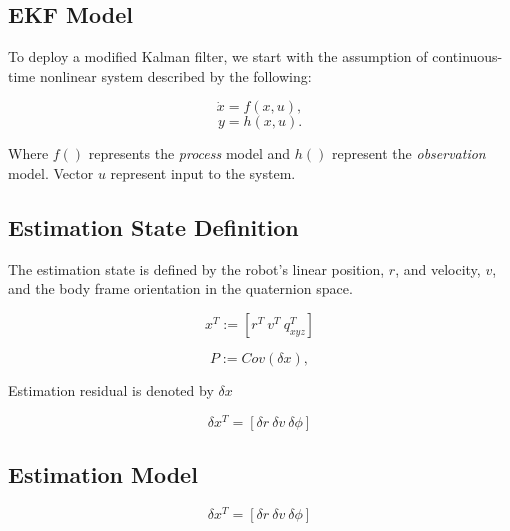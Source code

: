 \documentclass[letterpaper, 10 pt, conference]{ieeeconf}  %
\newcommand{\transpose}[1]{\ensuremath{#1^{\scriptscriptstyle T}}}
\begin{document}
\subsection{EKF Model}

To deploy a modified Kalman filter, we start with the assumption of continuous-time nonlinear system described by the following:

\begin{equation}
\dot{x} = f(x,u),
\end{equation}
\begin{equation}
y = h(x,u).
\end{equation}

Where $f()$ represents the \textit{process} model and $h()$ represent the
\textit{observation} model.
Vector $u$ represent input to the system.

\subsection{Estimation State Definition}

The estimation state is defined by the robot's linear position, $r$, and velocity,
$v$, and the body frame orientation in the quaternion space.

\begin{equation}
\label{eq:5}
\transpose{x} :=  \left[\transpose{r}~\transpose{v}~\transpose{q_{xyz}} \right]
\end{equation}

\begin{equation}
\label{eq:6}
P := Cov(\delta x),
\end{equation}

Estimation residual is denoted by $\delta x$


\begin{equation}
\label{eq:7}
\delta \transpose{x} = \left[\delta r~\delta v~\delta \phi \right]
\end{equation}

\subsection{Estimation Model}

\begin{equation}
\label{eq:8}
\delta \transpose{x} = \left[\delta r~\delta v~\delta \phi \right]
\end{equation}
\end{document}
